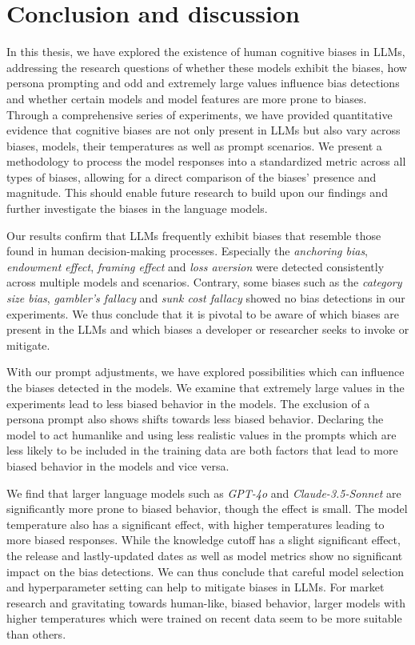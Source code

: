 \section{Conclusion and discussion}
\label{chapter:discussionoutlook}

\par In this thesis, we have explored the existence of human cognitive biases in LLMs, addressing the research questions of whether these models exhibit the biases, how persona prompting and odd and extremely large values influence bias detections and whether certain models and model features are more prone to biases. Through a comprehensive series of experiments, we have provided quantitative evidence that cognitive biases are not only present in LLMs but also vary across biases, models, their temperatures as well as prompt scenarios. We present a methodology to process the model responses into a standardized metric across all types of biases, allowing for a direct comparison of the biases' presence and magnitude. This should enable future research to build upon our findings and further investigate the biases in the language models.

\par Our results confirm that LLMs frequently exhibit biases that resemble those found in human decision-making processes. Especially the \textit{anchoring bias}, \textit{endowment effect}, \textit{framing effect} and \textit{loss aversion} were detected consistently across multiple models and scenarios. Contrary, some biases such as the \textit{category size bias}, \textit{gambler's fallacy} and \textit{sunk cost fallacy} showed no bias detections in our experiments. We thus conclude that it is pivotal to be aware of which biases are present in the LLMs and which biases a developer or researcher seeks to invoke or mitigate.

\par With our prompt adjustments, we have explored possibilities which can influence the biases detected in the models. We examine that extremely large values in the experiments lead to less biased behavior in the models. The exclusion of a persona prompt also shows shifts towards less biased behavior. Declaring the model to act humanlike and using less realistic values in the prompts which are less likely to be included in the training data are both factors that lead to more biased behavior in the models and vice versa.

\par We find that larger language models such as \textit{GPT-4o} and \textit{Claude-3.5-Sonnet} are significantly more prone to biased behavior, though the effect is small. The model temperature also has a significant effect, with higher temperatures leading to more biased responses. While the knowledge cutoff has a slight significant effect, the release and lastly-updated dates as well as model metrics show no significant impact on the bias detections. We can thus conclude that careful model selection and hyperparameter setting can help to mitigate biases in LLMs. For market research and gravitating towards human-like, biased behavior, larger models with higher temperatures which were trained on recent data seem to be more suitable than others.

